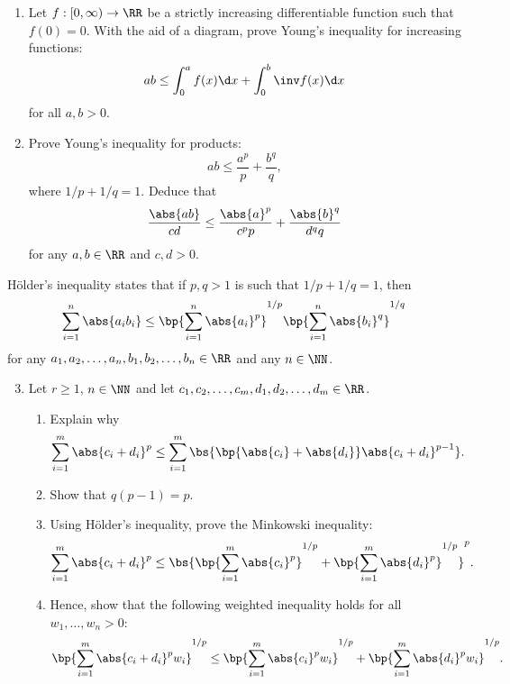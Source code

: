 \clearpage
\begin{problem}[\chili]
    \begin{enumerate}
        \item Let $f : [0, \infty) \to \RR$ be a strictly increasing differentiable function such that $f(0) = 0$. With the aid of a diagram, prove Young's inequality for increasing functions: \[ab \leq \int_0^a f(x) \d x + \int_0^b \inv f(x) \d x\] for all $a, b > 0$.
        \item Prove Young's inequality for products: \[ab \leq \frac{a^p}{p} + \frac{b^q}{q},\] where $1/p + 1/q = 1$. Deduce that \[\frac{\abs{ab}}{cd} \leq \frac{\abs{a}^p}{c^p p} + \frac{\abs{b}^q}{d^q q}\] for any $a, b \in \RR$ and $c, d > 0$.
    \end{enumerate}

    H\"{o}lder's inequality states that if $p, q > 1$ is such that $1/p + 1/q = 1$, then \[\sum_{i = 1}^n \abs{a_i b_i} \leq \bp{\sum_{i = 1}^n \abs{a_i}^p}^{1/p} \bp{\sum_{i = 1}^n \abs{b_i}^q}^{1/q}\] for any $a_1, a_2, \dots, a_n, b_1, b_2, \dots, b_n \in \RR$ and any $n \in \NN$.

    \begin{enumerate}
        \setcounter{enumi}{2}
        \item Let $r \geq 1$, $n \in \NN$ and let $c_1, c_2, \dots, c_m, d_1, d_2, \dots, d_m \in \RR$.
        \begin{enumerate}
            \item Explain why \[\sum_{i = 1}^m \abs{c_i + d_i}^p \leq \sum_{i = 1}^m \bs{\bp{\abs{c_i} + \abs{d_i}} \abs{c_i + d_i}^{p-1}}.\]
            \item Show that $q(p-1) = p$.
            \item Using H\"{o}lder's inequality, prove the Minkowski inequality: \[\sum_{i = 1}^m \abs{c_i + d_i}^p \leq \bs{\bp{\sum_{i = 1}^m \abs{c_i}^p}^{1/p} + \bp{\sum_{i = 1}^m \abs{d_i}^p}^{1/p}}^p.\]
            \item Hence, show that the following weighted inequality holds for all $w_1, \dots, w_n > 0$: \[\bp{\sum_{i = 1}^m \abs{c_i + d_i}^p w_i}^{1/p} \leq \bp{\sum_{i = 1}^m \abs{c_i}^p w_i}^{1/p} + \bp{\sum_{i = 1}^m \abs{d_i}^p w_i}^{1/p}.\]
        \end{enumerate}
    \end{enumerate}
\end{problem}
\clearpage

